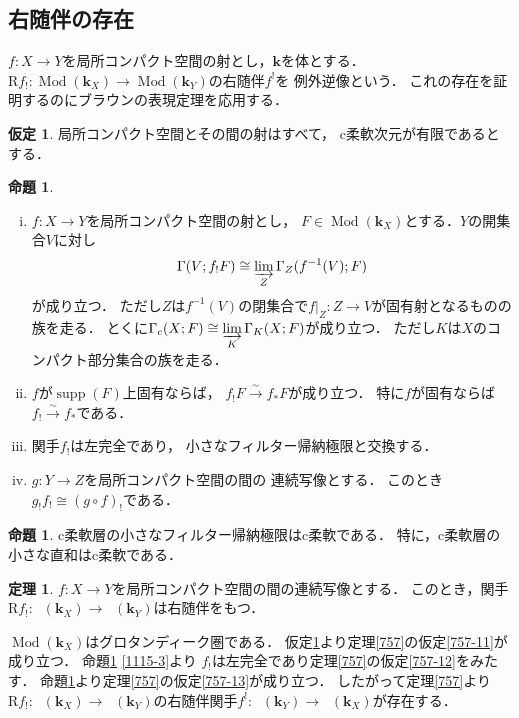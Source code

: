 \documentclass[uplatex,dvipdfmx,a4paper,10pt,draft]{jsarticle}
\makeatletter
\theoremstyle{definition}
\newcommand{\kk}{\mathbf{k}}
\newcommand{\Mod}{\mathop{\mathrm{Mod}}\nolimits}
\renewenvironment{proof}[1][\proofname]{\par
  \pushQED{\qed}%
  \normalfont \topsep6\p@\@plus6\p@\relax
  \trivlist
  \item[\hskip\labelsep
         \bfseries
    {#1}]\ignorespaces
}{%
  \popQED\endtrivlist\@endpefalse
}
\renewcommand{\proofname}{証明.}
\numberwithin{equation}{section}
\newcommand{\supp}{\mathop{\mathrm{supp}}\nolimits}
\newcommand{\Dompl}{\mathop{\mathsf{D}^\mathrm{+}}\nolimits}
\newcommand{\Rdf}{\mathrm{R}}
\newcommand{\simarr}{\mathrel{\overset{\sim}{\longrightarrow}}}%
\newcommand{\indlim}[1][]{\mathop{\varinjlim}\limits_{#1}}
\newcommand{\mres}[2][]{{\left.{#1}\right\rvert}_{#2}}
\theoremstyle{mystyle}
\newtheorem{THM}[AXM]{定理}
\newtheorem{PRP}[AXM]{命題}
\newtheorem{HPT}[AXM]{仮定}
\makeatother
\begin{document}
\subsection{右随伴の存在}

\(f\colon X\to Y\)を局所コンパクト空間の射とし，\(\kk\)を体とする．
\(
    \Rdf{f_{!}}\colon \Mod(\kk_X)\to\Mod(\kk_Y)
\)の右随伴\(f^{!}\)を
例外逆像という．
これの存在を証明するのにブラウンの表現定理を応用する．

\begin{HPT}\label{1141}
    局所コンパクト空間とその間の射はすべて，
    c柔軟次元が有限であるとする．
\end{HPT}

\begin{PRP}\label{1115}
    \begin{enumerate}[(i)]
        \item \(f\colon X\to Y\)を局所コンパクト空間の射とし，
        \(F\in\Mod(\kk_X)\)とする．\(Y\)の開集合\(V\)に対し\[
            \Gamma(V;f_{!}F)
            \cong
            \indlim[Z]\Gamma_{Z}(f^{-1}(V);F)
        \]が成り立つ．
        ただし\(Z\)は\(f^{-1}(V)\)の閉集合で\(
            \mres[f]{Z}\colon Z\to V
        \)が固有射となるものの族を走る．
        とくに\(
            \Gamma_{c}(X;F)
            \cong
            \indlim[K]\Gamma_{K}(X;F)
        \)が成り立つ．\label{1115-1}
        ただし\(K\)は\(X\)のコンパクト部分集合の族を走る．
        \item \(f\)が\(\supp(F)\)上固有ならば，
        \(f_{!}F\simarr f_{\ast}F\)が成り立つ．
        特に\(f\)が固有ならば\(f_{!}\simarr f_{\ast}\)である．\label{1115-2}
        \item 関手\(f_{!}\)は左完全であり，
        小さなフィルター帰納極限と交換する．\label{1115-3}
        \item \(g\colon Y\to Z\)を局所コンパクト空間の間の
        連続写像とする．
        このとき\(g_{!}f_{!}\cong (g\circ f)_{!}\)である．\label{1115-4}
    \end{enumerate}
\end{PRP}
\begin{PRP}\label{1124}
    c柔軟層の小さなフィルター帰納極限はc柔軟である．
    特に，c柔軟層の小さな直和はc柔軟である．
\end{PRP}

\begin{THM}
    \(f\colon X\to Y\)を局所コンパクト空間の間の連続写像とする．
    このとき，関手\(
        \Rdf{f_{!}}\colon
        \Dompl(\kk_{X})\to\Dompl(\kk_{Y})
    \)は右随伴をもつ．
\end{THM}
\begin{proof}
    \(\Mod(\kk_X)\)はグロタンディーク圏である．
    仮定\ref{1141}より定理\ref{757}の仮定\eqref{757-11}が成り立つ．
    命題\ref{1115} \eqref{1115-3}より
    \(f_!\)は左完全であり定理\ref{757}の仮定\eqref{757-12}をみたす．
    命題\ref{1124}より定理\ref{757}の仮定\eqref{757-13}が成り立つ．
    したがって定理\ref{757}より\(
        \Rdf{f_{!}}\colon \Dompl(\kk_X)\to\Dompl(\kk_Y)
    \)の右随伴関手\(
        f^{!}\colon\Dompl(\kk_Y)\to\Dompl(\kk_X)
    \)が存在する．
\end{proof}
\end{document}
